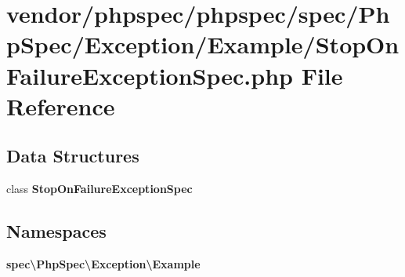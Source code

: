\section{vendor/phpspec/phpspec/spec/\+Php\+Spec/\+Exception/\+Example/\+Stop\+On\+Failure\+Exception\+Spec.php File Reference}
\label{_stop_on_failure_exception_spec_8php}
\subsection*{Data Structures}
\begin{DoxyCompactItemize}
\item 
class {\bf Stop\+On\+Failure\+Exception\+Spec}
\end{DoxyCompactItemize}
\subsection*{Namespaces}
\begin{DoxyCompactItemize}
\item 
 {\bf spec\textbackslash{}\+Php\+Spec\textbackslash{}\+Exception\textbackslash{}\+Example}
\end{DoxyCompactItemize}
